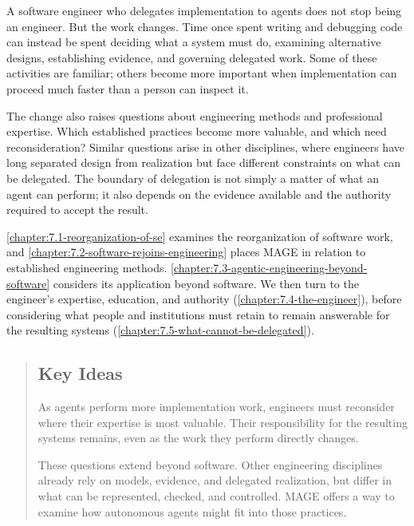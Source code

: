 

A software engineer who delegates implementation to agents does not stop being an engineer. But the work changes. Time once spent writing and debugging code can instead be spent deciding what a system must do, examining alternative designs, establishing evidence, and governing delegated work. Some of these activities are familiar; others become more important when implementation can proceed much faster than a person can inspect it.

The change also raises questions about engineering methods and professional expertise. Which established practices become more valuable, and which need reconsideration? Similar questions arise in other disciplines, where engineers have long separated design from realization but face different constraints on what can be delegated. The boundary of delegation is not simply a matter of what an agent can perform; it also depends on the evidence available and the authority required to accept the result.

\cref{chapter:7.1-reorganization-of-se} examines the reorganization of software work, and \cref{chapter:7.2-software-rejoins-engineering} places MAGE in relation to established engineering methods. \cref{chapter:7.3-agentic-engineering-beyond-software} considers its application beyond software. We then turn to the engineer's expertise, education, and authority (\cref{chapter:7.4-the-engineer}), before considering what people and institutions must retain to remain answerable for the resulting systems (\cref{chapter:7.5-what-cannot-be-delegated}).



\begin{quote}
\mbox{}%
\subsection{Key Ideas}\label{heading:the-synthesis}

As agents perform more implementation work, engineers must reconsider where their expertise is most valuable. Their responsibility for the resulting systems remains, even as the work they perform directly changes.

These questions extend beyond software. Other engineering disciplines already rely on models, evidence, and delegated realization, but differ in what can be represented, checked, and controlled. MAGE offers a way to examine how autonomous agents might fit into those practices.
\end{quote}
